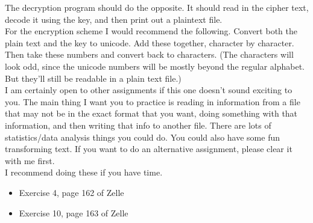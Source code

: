 \documentclass[12pt]{article}
\begin{document}
\noindent The decryption program should do the opposite.  It should
read in the cipher text, decode it using the key, and then print out a
plaintext file. \\

\noindent For the encryption scheme I would recommend the following.
Convert both the plain text and the key to unicode.  Add these
together, character by character.  Then take these numbers and convert
back to characters.  (The characters will look odd, since the unicode
numbers will be mostly beyond the regular alphabet.  But they'll still
be readable in a plain text file.)  \\


  I am certainly open to other
assignments if this one doesn't sound exciting to you.  The main thing
I want you to practice is reading in information from a file that may
not be in the exact format that you want, doing something with that
information, and then writing that info to another file.  There are
lots of statistics/data analysis things you could do.  You could also
have some fun transforming text.  If you want to do an alternative
assignment, please clear it with me first.  \\

  I recommend doing these if you
have time. 
\begin{itemize}
\setlength{\itemsep}{-1mm}
  \item Exercise 4, page 162 of Zelle
  \item Exercise 10, page 163 of Zelle
\end{itemize}
\end{document}

